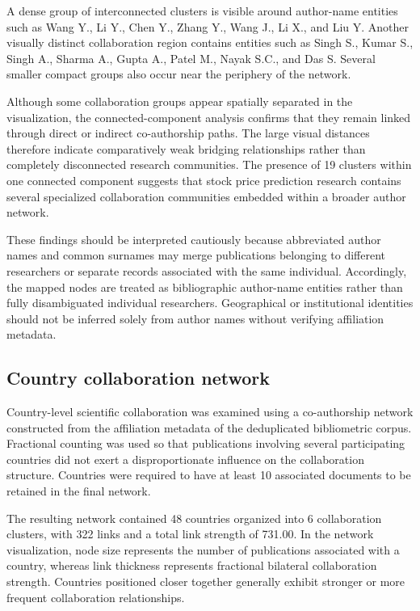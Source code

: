 \documentclass[pdflatex,sn-mathphys-num]{sn-jnl}%
\theoremstyle{thmstyleone}%
\theoremstyle{thmstyletwo}%
\theoremstyle{thmstylethree}%
\begin{document}
A dense group of interconnected clusters is visible around author-name entities such as Wang Y., Li Y., Chen Y., Zhang Y., Wang J., Li X., and Liu Y. Another visually distinct collaboration region contains entities such as Singh S., Kumar S., Singh A., Sharma A., Gupta A., Patel M., Nayak S.C., and Das S. Several smaller compact groups also occur near the periphery of the network.

Although some collaboration groups appear spatially separated in the visualization, the connected-component analysis confirms that they remain linked through direct or indirect co-authorship paths. The large visual distances therefore indicate comparatively weak bridging relationships rather than completely disconnected research communities. The presence of 19 clusters within one connected component suggests that stock price prediction research contains several specialized collaboration communities embedded within a broader author network.

These findings should be interpreted cautiously because abbreviated author names and common surnames may merge publications belonging to different researchers or separate records associated with the same individual. Accordingly, the mapped nodes are treated as bibliographic author-name entities rather than fully disambiguated individual researchers. Geographical or institutional identities should not be inferred solely from author names without verifying affiliation metadata.


\subsection{Country collaboration network}

Country-level scientific collaboration was examined using a co-authorship network constructed from the affiliation metadata of the deduplicated bibliometric corpus. Fractional counting was used so that publications involving several participating countries did not exert a disproportionate influence on the collaboration structure. Countries were required to have at least 10 associated documents to be retained in the final network.

The resulting network contained 48 countries organized into 6 collaboration clusters, with 322 links and a total link strength of 731.00. In the network visualization, node size represents the number of publications associated with a country, whereas link thickness represents fractional bilateral collaboration strength. Countries positioned closer together generally exhibit stronger or more frequent collaboration relationships.
\end{document}
